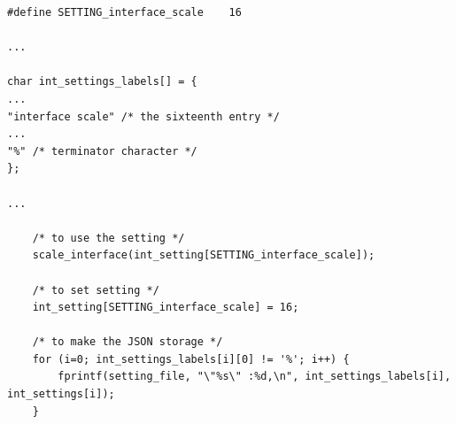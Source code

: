 \begin{lstlisting}
#define SETTING_interface_scale    16

...

char int_settings_labels[] = {
...
"interface scale" /* the sixteenth entry */
...
"%" /* terminator character */
};

...

    /* to use the setting */
    scale_interface(int_setting[SETTING_interface_scale]);

    /* to set setting */
    int_setting[SETTING_interface_scale] = 16;

    /* to make the JSON storage */
    for (i=0; int_settings_labels[i][0] != '%'; i++) {
        fprintf(setting_file, "\"%s\" :%d,\n", int_settings_labels[i], int_settings[i]);
    }
\end{lstlisting}

